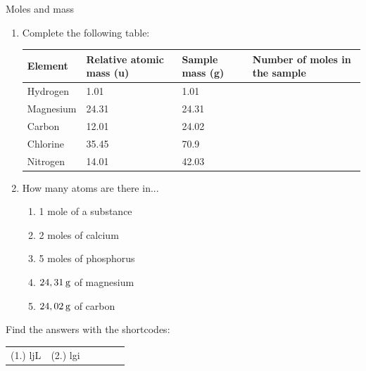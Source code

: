 	\par
\label{m38717*secfhsst!!!underscore!!!id127}
            \begin{exercises}{Moles and mass
      }
            \nopagebreak
      \label{m38717*id276067}\begin{enumerate}[noitemsep, label=\textbf{\arabic*}. ] 
            \label{m38717*uid2}\item 
Complete the following table:
          \begin{table}[H]
        \begin{center}
      \label{m38717*id276082}
    \noindent
      \begin{tabular}{|l|l|l|l|}\hline
\textbf{Element} & \textbf{Relative atomic mass (u)} & \textbf{Sample mass (g)} & \textbf{Number of moles in the sample} \\ \hline
        Hydrogen & 1.01 & 1.01 & \\ \hline
        Magnesium & 24.31 & 24.31 & \\ \hline
        Carbon & 12.01 & 24.02 & \\ \hline
        Chlorine & 35.45 & 70.9 & \\ \hline
        Nitrogen & 14.01 & 42.03 & \\ \hline
    \end{tabular}
      \end{center}
\end{table}
    \par
         \label{m38717*uid3}\item 
How many atoms are there in...
\label{m38717*id276311}\begin{enumerate}[noitemsep, label=\textbf{\alph*}. ] 
            \label{m38717*uid4}\item 1 mole of a substance
\label{m38717*uid5}\item 2 moles of calcium
\label{m38717*uid6}\item 5 moles of phosphorus
\label{m38717*uid7}\item $24,31\phantom{\rule{2pt}{0ex}}\text{g}$ of magnesium
\label{m38717*uid8}\item $24,02\phantom{\rule{2pt}{0ex}}\text{g}$ of carbon
\end{enumerate}
                \end{enumerate}
    \label{m38717*cid3}
\par {} Find the answers with the shortcodes:
 \par \begin{tabular}[h]{cccccc}
 (1.) ljL  &  (2.) lgi  & \end{tabular}
\end{exercises}
